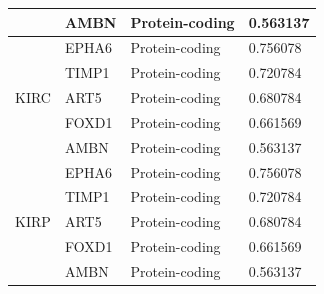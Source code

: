 \begin{table}
\begin{center}
{\begin{tabular}{l|l|l|l}
        & AMBN & Protein-coding & 0.563137 \\ %
        \midrule
        \multirow{5}{*}{KIRC}& EPHA6 & Protein-coding & 0.756078 \\ %
        & TIMP1 & Protein-coding & 0.720784 \\ %
        & ART5 & Protein-coding & 0.680784 \\ %
        & FOXD1 & Protein-coding & 0.661569 \\ %
        & AMBN & Protein-coding & 0.563137 \\ %
        \midrule
        \multirow{5}{*}{KIRP}& EPHA6 & Protein-coding & 0.756078 \\ %
        & TIMP1 & Protein-coding & 0.720784 \\ %
        & ART5 & Protein-coding & 0.680784 \\ %
        & FOXD1 & Protein-coding & 0.661569 \\ %
        & AMBN & Protein-coding & 0.563137 \\ %
        \midrule
        \bottomrule
        \end{tabular}}
        \vspace{-4mm}
    \end{center}
\end{table}

